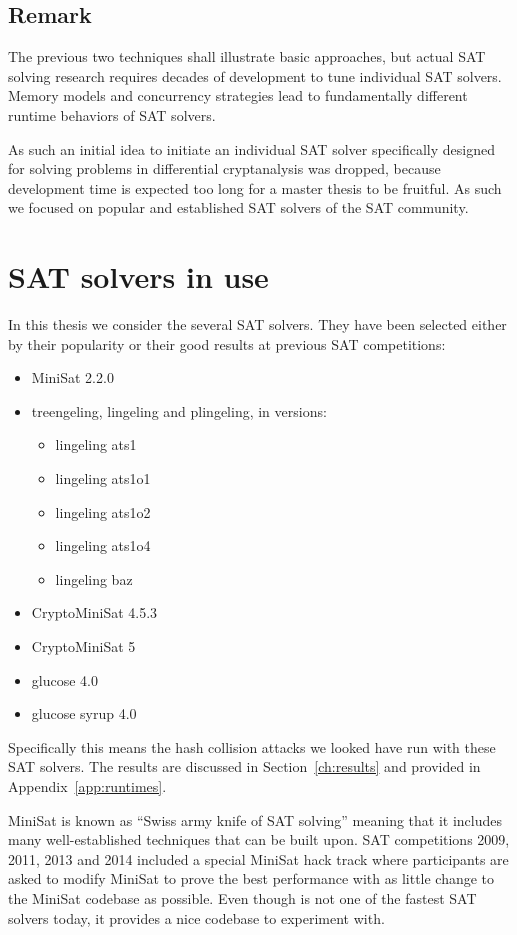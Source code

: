 \subsection{Remark}
\label{sec:sat-remark}
%
The previous two techniques shall illustrate basic approaches, but actual SAT
solving research requires decades of development to tune individual SAT solvers.
Memory models and concurrency strategies lead to fundamentally different runtime
behaviors of SAT solvers.

As such an initial idea to initiate an individual SAT solver specifically designed for
solving problems in differential cryptanalysis was dropped, because development time
is expected too long for a master thesis to be fruitful. As such we focused on popular
and established SAT solvers of the SAT community.

\section{SAT solvers in use}
\label{sec:sat-solvers}
%
In this thesis we consider the several SAT solvers.
They have been selected either by their popularity
or their good results at previous SAT competitions:
\begin{itemize}
  \item MiniSat 2.2.0
  \item treengeling, lingeling and plingeling, in versions:
    \begin{itemize}
      \item lingeling ats1
      \item lingeling ats1o1
      \item lingeling ats1o2
      \item lingeling ats1o4
      \item lingeling baz
    \end{itemize}
  \item CryptoMiniSat 4.5.3
  \item CryptoMiniSat 5
  \item glucose 4.0
  \item glucose syrup 4.0
\end{itemize}

Specifically this means the hash collision attacks we looked have run with
these SAT solvers. The results are discussed in Section~\ref{ch:results}
and provided in Appendix~\ref{app:runtimes}.

MiniSat is known as \enquote{Swiss army knife of SAT solving} meaning that
it includes many well-established techniques that can be built upon.
SAT competitions 2009, 2011, 2013 and 2014 included a special MiniSat
hack track where participants are asked to modify MiniSat to prove the
best performance with as little change to the MiniSat codebase as possible.
Even though is not one of the fastest SAT solvers today, it provides
a nice codebase to experiment with.

